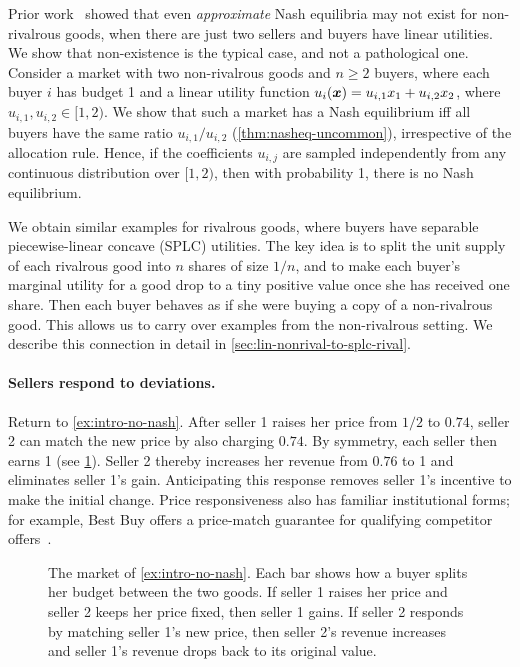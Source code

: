 Prior work~\cite{chaudhury2026equilibrium} showed that even \emph{approximate} Nash equilibria may not exist
for non-rivalrous goods, when there are just two sellers and buyers have linear utilities.
We show that non-existence is the typical case, and not a pathological one.
Consider a market with two non-rivalrous goods and $n \ge 2$ buyers,
where each buyer $i$ has budget 1 and a linear utility function
$u_i(\bm{x}) = u_{i,1}x_1 + u_{i,2}x_2$, where $u_{i,1}, u_{i,2} \in [1, 2)$.
We show that such a market has a Nash equilibrium iff
all buyers have the same ratio $u_{i,1}/u_{i,2}$ (\cref{thm:nasheq-uncommon}),
irrespective of the allocation rule.
Hence, if the coefficients $u_{i,j}$ are sampled independently
from any continuous distribution over $[1, 2)$,
then with probability 1, there is no Nash equilibrium.

We obtain similar examples for rivalrous goods, where buyers have
separable piecewise-linear concave (SPLC) utilities.
The key idea is to split the unit supply of each rivalrous good into $n$ shares of size $1/n$,
and to make each buyer's marginal utility for a good drop to a tiny positive value
once she has received one share.
Then each buyer behaves as if she were buying a copy of a non-rivalrous good.
This allows us to carry over examples from the non-rivalrous setting.
We describe this connection in detail in \cref{sec:lin-nonrival-to-splc-rival}.

\paragraph{Sellers respond to deviations.}
Return to \cref{ex:intro-no-nash}.
After seller 1 raises her price from $1/2$ to $0.74$,
seller 2 can match the new price by also charging $0.74$.
By symmetry, each seller then earns 1 (see \cref{fig:response-example}).
Seller 2 thereby increases her revenue from $0.76$ to 1
and eliminates seller 1's gain.
Anticipating this response removes seller 1's incentive to make the initial change.
Price responsiveness also has familiar institutional forms;
for example, Best Buy offers a price-match guarantee for qualifying
competitor offers~\cite{BestBuyPriceMatch}.

\begin{figure}[t]
\centering

\caption{The market of \cref{ex:intro-no-nash}.
Each bar shows how a buyer splits her budget between the two goods.
If seller 1 raises her price and seller 2 keeps her price fixed, then seller 1 gains.
If seller 2 responds by matching seller 1's new price,
then seller 2's revenue increases and seller 1's revenue drops back to its original value.}
\label{fig:response-example}
\end{figure}

